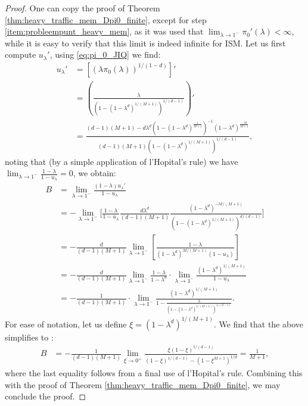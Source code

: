 \documentclass[12pt]{report}
\begin{document}
\begin{proof}
One can copy the proof of Theorem \ref{thm:heavy_traffic_mem_Dpi0_finite}, except for step \ref{item:probleempunt_heavy_mem}, as it was used that $\lim_{\lambda \rightarrow 1^-} \pi_0'(\lambda) < \infty$, while it is easy to verify that this limit is indeed infinite for ISM. Let us first compute $u_\lambda'$, using \eqref{eq:pi_0_JIQ} we find:
\begin{align*}
u_\lambda'
&= \left[(\lambda \pi_0(\lambda))^{1/(1-d)} \right] '\\
&= \left( \frac{\lambda}{(1-(1-\lambda^d)^{1/(M+1)})^{1/(d-1)}}\right)'\\
&= \frac{(d-1)(M+1) - d \lambda ^d (1-(1-\lambda^d)^{\frac{1}{M+1}})^{-1} (1-\lambda^d)^{\frac{-M}{M+1}}}{(d-1)(M+1)(1-(1-\lambda^d)^{1/(M+1)})^{1/(d-1)}},
\end{align*}
noting that (by a simple application of l'Hopital's rule) we have $\lim_{\lambda \rightarrow 1^-} \frac{1-\lambda}{1-u_{\lambda}}=0$, we obtain:
\begin{align*}
B
&=\lim_{\lambda \rightarrow 1^-} \frac{(1-\lambda) u_\lambda'}{1-u_\lambda}\\
&= -\lim_{\lambda\rightarrow 1^-} \bigg[ \frac{1-\lambda}{1-u_\lambda} \frac{d \lambda^d}{(d-1)(M+1)} \frac{(1-\lambda^d)^{-M/(M+1)}}{(1-(1-\lambda^d)^{1/(M+1)})^{d/(d-1)}} \bigg]\\
&= -\frac{d}{(d-1)(M+1)} \lim_{\lambda\rightarrow 1^-} \left[ \frac{1-\lambda}{(1-\lambda^d)^{M/(M+1)}(1-u_\lambda)} \right]\\
&=-\frac{d}{(d-1)(M+1)} \lim_{\lambda\rightarrow 1^-} \frac{1-\lambda}{1-\lambda^d} \cdot \lim_{\lambda \rightarrow 1^-} \frac{(1-\lambda^d)^{1/(M+1)}}{1-u_\lambda} \\
&= -\frac{1}{(d-1)(M+1)} \cdot \lim_{\lambda \rightarrow 1^-} \frac{(1-\lambda^d)^{1/(M+1)}}{1-
\frac{\lambda}{\left(1-(1-\lambda^d)^{1/(M+1)}\right)^{1/(d-1)}}}.
\end{align*}
For ease of notation, let us define $\xi = (1-\lambda^d)^{1/(M+1)}$. We find that the above simplifies to :
\begin{align*}
B
&= -\frac{1}{(d-1)(M+1)} \lim_{\xi \rightarrow 0^+} \frac{\xi (1-\xi)^{1/(d-1)}}{(1-\xi)^{1/(d-1)} - (1-\xi^{M+1})^{1/d}} = \frac{1}{M+1},
\end{align*}
where the last equality follows from a final use of l'Hopital's rule. Combining this with the proof of Theorem \ref{thm:heavy_traffic_mem_Dpi0_finite}, we may conclude the proof.
\end{proof}
\end{document}
